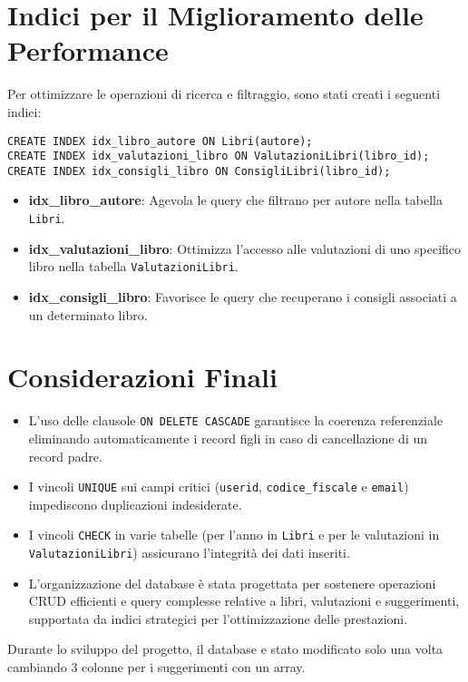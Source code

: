 \documentclass{report}
\begin{document}
\section{Indici per il Miglioramento delle Performance}
Per ottimizzare le operazioni di ricerca e filtraggio, sono stati creati i seguenti indici:

\begin{lstlisting}
CREATE INDEX idx_libro_autore ON Libri(autore);
CREATE INDEX idx_valutazioni_libro ON ValutazioniLibri(libro_id);
CREATE INDEX idx_consigli_libro ON ConsigliLibri(libro_id);
\end{lstlisting}

\begin{itemize}
    \item \textbf{idx\_libro\_autore}: Agevola le query che filtrano per autore nella tabella \texttt{Libri}.
    \item \textbf{idx\_valutazioni\_libro}: Ottimizza l'accesso alle valutazioni di uno specifico libro nella tabella \texttt{ValutazioniLibri}.
    \item \textbf{idx\_consigli\_libro}: Favorisce le query che recuperano i consigli associati a un determinato libro.
\end{itemize}


\section{Considerazioni Finali}
\begin{itemize}
    \item L'uso delle clausole \texttt{ON DELETE CASCADE} garantisce la coerenza referenziale eliminando automaticamente i record figli in caso di cancellazione di un record padre.
    \item I vincoli \texttt{UNIQUE} sui campi critici (\texttt{userid}, \texttt{codice\_fiscale} e \texttt{email}) impediscono duplicazioni indesiderate.
    \item I vincoli \texttt{CHECK} in varie tabelle (per l'anno in \texttt{Libri} e per le valutazioni in \texttt{ValutazioniLibri}) assicurano l'integrità dei dati inseriti.
    \item L'organizzazione del database è stata progettata per sostenere operazioni CRUD efficienti e query complesse relative a libri, valutazioni e suggerimenti, supportata da indici strategici per l'ottimizzazione delle prestazioni.
\end{itemize}

Durante lo sviluppo del progetto, il database e stato modificato solo una volta cambiando 3 colonne per i suggerimenti con un array. 
\end{document}

